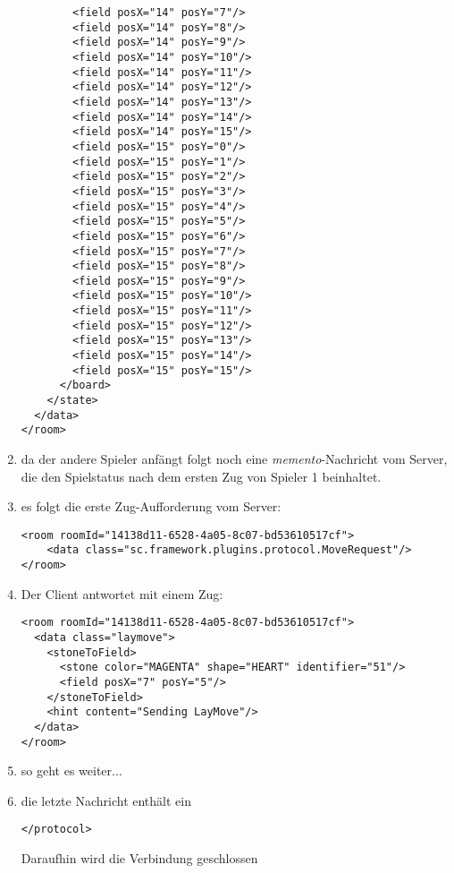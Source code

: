 \documentclass[12pt,a4paper, ngerman, oneside]{scrartcl}
\begin{document}
\begin{enumerate}
\begin{verbatim}
        <field posX="14" posY="7"/>
        <field posX="14" posY="8"/>
        <field posX="14" posY="9"/>
        <field posX="14" posY="10"/>
        <field posX="14" posY="11"/>
        <field posX="14" posY="12"/>
        <field posX="14" posY="13"/>
        <field posX="14" posY="14"/>
        <field posX="14" posY="15"/>
        <field posX="15" posY="0"/>
        <field posX="15" posY="1"/>
        <field posX="15" posY="2"/>
        <field posX="15" posY="3"/>
        <field posX="15" posY="4"/>
        <field posX="15" posY="5"/>
        <field posX="15" posY="6"/>
        <field posX="15" posY="7"/>
        <field posX="15" posY="8"/>
        <field posX="15" posY="9"/>
        <field posX="15" posY="10"/>
        <field posX="15" posY="11"/>
        <field posX="15" posY="12"/>
        <field posX="15" posY="13"/>
        <field posX="15" posY="14"/>
        <field posX="15" posY="15"/>
      </board>
    </state>
  </data>
</room>
\end{verbatim}
\item da der andere Spieler anfängt folgt noch eine \textit{memento}-Nachricht vom Server, die den Spielstatus nach dem ersten Zug von Spieler 1 beinhaltet.
\item es folgt die erste Zug-Aufforderung vom Server: \begin{verbatim}
<room roomId="14138d11-6528-4a05-8c07-bd53610517cf">
    <data class="sc.framework.plugins.protocol.MoveRequest"/>
</room>
\end{verbatim}
\item Der Client antwortet mit einem Zug: \begin{verbatim}
<room roomId="14138d11-6528-4a05-8c07-bd53610517cf">
  <data class="laymove">
    <stoneToField>
      <stone color="MAGENTA" shape="HEART" identifier="51"/>
      <field posX="7" posY="5"/>
    </stoneToField>
    <hint content="Sending LayMove"/>
  </data>
</room>
\end{verbatim}
\item so geht es weiter...
\item die letzte Nachricht enthält ein \begin{verbatim}
</protocol>
\end{verbatim}
Daraufhin wird die Verbindung geschlossen
\end{enumerate}
\end{document}
